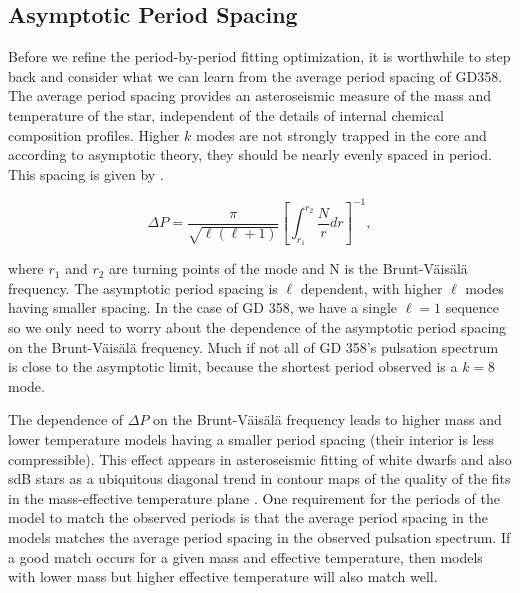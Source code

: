 \documentclass[12pt,preprint]{aastex}
\newcommand{\bvf}{Brunt-V\"ais\"al\"a }
\begin{document}
\subsection{Asymptotic Period Spacing}
\label{periodspacing}

Before we refine the period-by-period fitting optimization, it is worthwhile to step back and consider 
what we can learn from the average period spacing of GD358. The average period spacing provides an 
asteroseismic measure of the mass and temperature of the star, independent of the details of 
internal chemical composition profiles. Higher $k$ modes are not strongly trapped in the core and 
according to asymptotic theory, they should be nearly evenly spaced in period. This spacing is 
given by \citet{Unno89}.

\begin{equation}
\label{fiteq2}
\Delta P = \frac{\pi}{\sqrt{\ell(\ell + 1)}}\left[\int_{r_1}^{r_2}\frac{N}{r}dr\right]^{-1},
\end{equation}

\noindent
where $r_1$ and $r_2$ are turning points of the mode and N is the Brunt-V\"{a}is\"{a}l\"{a} frequency. 
The asymptotic period spacing is $\ell$ dependent, with higher $\ell$ modes having smaller spacing. 
In the case of GD 358, we have a single $\ell=1$ sequence so we only need to worry about the dependence 
of the asymptotic period spacing on the \bvf frequency. Much if not all of GD 358's pulsation 
spectrum is close to the asymptotic limit, because the shortest period observed is a $k=8$ mode.

The dependence of $\Delta P$ on the \bvf frequency leads to higher mass and lower temperature models 
having a smaller period spacing (their interior is less compressible). This effect appears in asteroseismic 
fitting of white dwarfs and also sdB stars as a ubiquitous diagonal trend in contour maps of the quality 
of the fits in the mass-effective temperature plane \citep[e.g][]{Bischoff-Kim14,Castanheira09,Charpinet08}. 
One requirement for the periods of the model to match the observed periods is that the average period spacing 
in the models matches the average period spacing in the observed pulsation spectrum. If a good match occurs 
for a given mass and effective temperature, then models with lower mass but higher effective temperature 
will also match well.
\end{document}
